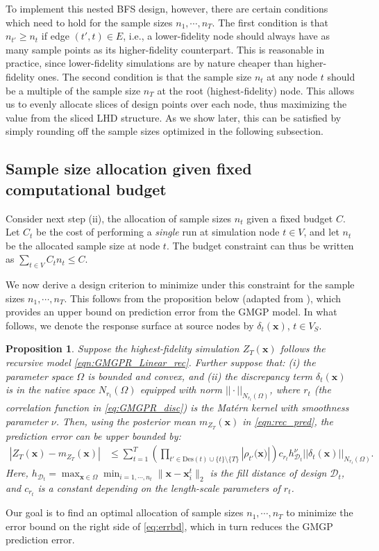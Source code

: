 \documentclass[12pt]{article}
\newtheorem{prop}{Proposition}
\newcommand{\bs}[1]{\boldsymbol{#1}}
\begin{document}
To implement this nested BFS design, however, there are certain conditions which need to hold for the sample sizes $n_1, \cdots, n_T$. The first condition is that $n_{t'} \geq n_t$ if edge $(t',t) \in E$, i.e., a lower-fidelity node should always have as many sample points as its higher-fidelity counterpart. This is reasonable in practice, since lower-fidelity simulations are by nature cheaper than higher-fidelity ones. The second condition is that the sample size $n_t$ at any node $t$ should be a multiple of the sample size $n_T$ at the root (highest-fidelity) node. This allows us to evenly allocate slices of design points over each node, thus maximizing the value from the sliced LHD structure. As we show later, this can be satisfied by simply rounding off the sample sizes optimized in the following subsection. 

\subsection{Sample size allocation given fixed computational budget} 

Consider next step (ii), the allocation of sample sizes $n_t$ given a fixed budget $C$. Let $C_t$ be the cost of performing a \textit{single} run at simulation node $t \in V$, and let $n_t$ be the allocated sample size at node $t$. The budget constraint can thus be written as $\sum_{t \in V} C_t n_t \leq C$. 

We now derive a design criterion to minimize under this constraint for the sample sizes $n_1, \cdots, n_T$. This follows from the proposition below (adapted from \citealp{wu1993local}), which provides an upper bound on prediction error from the GMGP model. In what follows, we denote the response surface at source nodes by $\delta_t(\bs{x})$, $t\in V_S$.

\begin{prop}
Suppose the highest-fidelity simulation $Z_T(\bs{x})$ follows the recursive model \eqref{eqn:GMGPR_Linear_rec}. Further suppose that: (i) the parameter space $\Omega$ is bounded and convex, and (ii) the discrepancy term $\delta_t(\bs{x})$ is in the native space $N_{r_t}(\Omega)$ equipped with norm $||\cdot||_{N_{r_t}(\Omega)}$, where $r_t$ (the correlation function in \eqref{eq:GMGPR_disc}) is the Mat\'ern kernel with smoothness parameter $\nu$. Then, using the posterior mean $m_{Z_T}(\bs{x})$ in \eqref{eqn:rec_pred}, the prediction error can be upper bounded by:
\begin{align}
\label{eq:errbd}
    |Z_T(\bs{x})-m_{Z_T}(\bs{x})| &\leq \sum_{t=1}^T\left(\prod_{t'\in \mathrm{Des}(t)\cup\{t\}\setminus\{T\}}|\rho_{t'}(\bs{{x})}|\right)c_{r_t}h_{\mathcal{D}_t}^{\nu}||\delta_t(\bs{x})||_{N_{r_t}(\Omega)}.
\end{align}
Here, $h_{\mathcal{D}_t} = \max_{\bs{x} \in \Omega} \min_{i=1, \cdots, n_t}\|\bs{x}-\bs{x}_i^t\|_2$ is the fill distance of design $\mathcal{D}_t$, and $c_{r_t}$ is a constant depending on the length-scale parameters of $r_t$.
\end{prop}
\noindent Our goal is to find an optimal allocation of sample sizes $n_1, \cdots, n_T$ to minimize the error bound on the right side of \eqref{eq:errbd}, which in turn reduces the GMGP prediction error.
\end{document}
